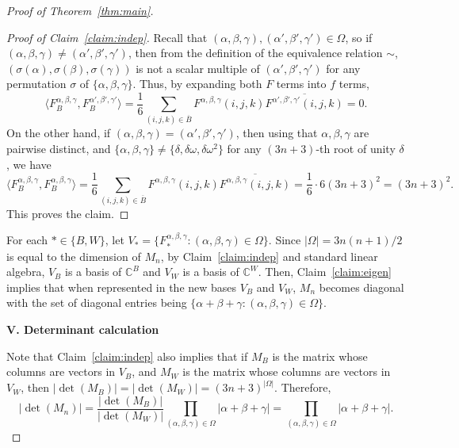 \documentclass{article}
\begin{document}
\begin{proof}[Proof of Theorem~\ref{thm:main}]
\begin{proof}[Proof of Claim~\ref{claim:indep}]
Recall that $(\alpha,\beta,\gamma),(\alpha',\beta',\gamma')\in \Omega$, so if $(\alpha,\beta,\gamma)\not=(\alpha',\beta',\gamma')$, then from the definition of the equivalence relation $\sim$, $(\sigma(\alpha),\sigma(\beta),\sigma(\gamma))$ is not a scalar multiple of $(\alpha',\beta',\gamma')$ for any permutation $\sigma$ of $\{\alpha,\beta,\gamma\}$. Thus, by expanding both $F$ terms into $f$ terms,
\[\langle F^{\alpha,\beta,\gamma}_B,F^{\alpha',\beta',\gamma'}_B\rangle=\frac16\sum_{(i,j,k)\in\overline{B}}F^{\alpha,\beta,\gamma}(i,j,k)\overline{F^{\alpha',\beta',\gamma'}(i,j,k)}=0.\]
On the other hand, if $(\alpha,\beta,\gamma)=(\alpha',\beta',\gamma')$, then using that $\alpha,\beta,\gamma$ are pairwise distinct, and $\{\alpha,\beta,\gamma\}\not=\{\delta,\delta\omega,\delta\omega^2\}$ for any $(3n+3)$-th root of unity $\delta$, we have
\[\langle F^{\alpha,\beta,\gamma}_B,F^{\alpha,\beta,\gamma}_B\rangle=\frac16\sum_{(i,j,k)\in\overline{B}}F^{\alpha,\beta,\gamma}(i,j,k)\overline{F^{\alpha,\beta,\gamma}(i,j,k)}=\frac16\cdot6(3n+3)^2=(3n+3)^2.\]
This proves the claim.
\renewcommand{\qedsymbol}{$\boxdot$}
\end{proof}
\renewcommand{\qedsymbol}{$\square$}

For each $\ast\in\{B,W\}$, let $V_\ast=\{F^{\alpha,\beta,\gamma}_{\ast}:(\alpha,\beta,\gamma)\in \Omega\}$. Since $|\Omega|=3n(n+1)/2$ is equal to the dimension of $M_n$, by Claim~\ref{claim:indep} and standard linear algebra, $V_B$ is a basis of $\mathbb{C}^B$ and $V_W$ is a basis of $\mathbb{C}^W$. Then, Claim~\ref{claim:eigen} implies that when represented in the new bases $V_B$ and $V_W$, $M_n$ becomes diagonal with the set of diagonal entries being $\{\alpha+\beta+\gamma:(\alpha,\beta,\gamma)\in \Omega\}$. 

\medskip
\textbf{V. Determinant calculation}

Note that Claim~\ref{claim:indep} also implies that if $M_B$ is the matrix whose columns are vectors in $V_B$, and $M_W$ is the matrix whose columns are vectors in $V_W$, then $|\det(M_B)|=|\det(M_W)|=(3n+3)^{|\Omega|}$. Therefore,
\[|\det(M_n)|=\frac{|\det(M_B)|}{|\det(M_W)|}\prod_{(\alpha,\beta,\gamma)\in \Omega}|\alpha+\beta+\gamma|=\prod_{(\alpha,\beta,\gamma)\in \Omega}|\alpha+\beta+\gamma|.\]


\end{proof}
\end{document}
